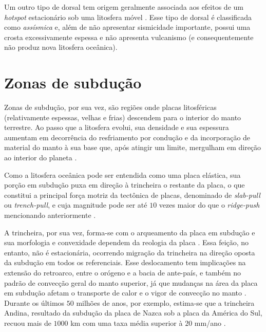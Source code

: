 Um outro tipo de dorsal tem origem geralmente associada aos efeitos de um \textit{hotspot} estacionário sob uma litosfera móvel \citep{vanhunen2002,vogt1973}. Esse tipo de dorsal é classificada como \emph{assísmica} e, além de não apresentar sismicidade importante, possui uma crosta excessivamente espessa e não apresenta vulcanismo (e consequentemente não produz nova litosfera oceânica). 

\section{Zonas de subdução}

Zonas de subdução, por sua vez, são regiões onde placas litosféricas (relativamente espessas, velhas e frias) descendem para o interior do manto terrestre. Ao passo que a litosfera evolui, sua densidade e sua espessura aumentam em decorrência do resfriamento por condução e da incorporação de material do manto à sua base que, após atingir um limite, mergulham em direção ao interior do planeta \citep{turcotte2002geodynamics}. 

Como a litosfera oceânica pode ser entendida como uma placa elástica, sua porção em subdução puxa em direção à trincheira o restante da placa, o que constitui a principal força motriz da tectônica de placas, denominado de \textit{slab-pull} ou \textit{trench-pull}, e cuja magnitude pode ser até $10$ vezes maior do que o \textit{ridge-push} mencionando anteriormente \citep{allen2013basin}. 

A trincheira, por sua vez, forma-se com o arqueamento da placa em subdução e sua morfologia e convexidade dependem da reologia da placa \citep{turcotte2002geodynamics}. Essa feição, no entanto, não é estacionária, ocorrendo migração da trincheira na direção oposta da subdução em todos os referenciais. Esse deslocamento tem implicações na extensão do retroarco, entre o orógeno e a bacia de ante-país, e também no padrão de convecção geral do manto superior, já que mudanças na área da placa em subdução afetam o transporte de calor e o vigor de convecção no manto \citep{becker2009review}. Durante os últimos $50$ milhões de anos, por exemplo, estima-se que a trincheira Andina, resultado da subdução da placa de Nazca sob a placa da América do Sul, recuou mais de $1000$ km com uma taxa média superior à $20$ mm/ano \citep{schellart2007evolution}.

